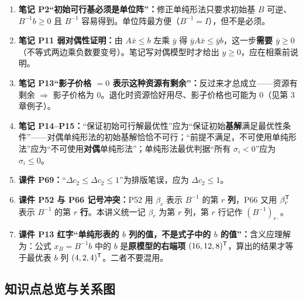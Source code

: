 \begin{correctionbox}[纠错 6　表述不严谨的几处]
\begin{enumerate}[leftmargin=1.5em]
  \item \textbf{笔记 P2“初始可行基必须是单位阵”：}修正单纯形法只要求初始基 $B$ 可逆、$B^{-1}b\ge0$ 且 $B^{-1}$ 容易得到。单位阵最方便（$B^{-1}=I$），但不是必须。
  \item \textbf{笔记 P11 弱对偶性证明：}由 $A\bar x\le b$ 左乘 $\bar y$ 得 $\bar yA\bar x\le\bar yb$，这一步\textbf{需要 $\bar y\ge0$}（不等式两边乘负数要变号）。笔记写对偶模型时才给出 $y\ge0$，应在相乘前说明。
  \item \textbf{笔记 P13“影子价格 $=0$ 表示这种资源有剩余”：}反过来才总成立——资源有剩余 $\Rightarrow$ 影子价格为 0。退化时资源恰好用尽、影子价格也可能为 0（见第 3 章例子）。
  \item \textbf{笔记 P14--P15：}“保证初始可行解最优性”应为“保证初始\textbf{基解}满足最优性条件”——对偶单纯形法的初始基解恰恰不可行；“前提不满足，不可使用单纯形法”应为“不可使用\textbf{对偶}单纯形法”；单纯形法最优判据“所有 $\sigma_i<0$”应为 $\sigma_i\le0$。
  \item \textbf{课件 P69：}“$\Delta c_2\le\Delta c_2\le1$”为排版笔误，应为 $\Delta c_2\le1$。
  \item \textbf{课件 P52 与 P66 记号冲突：}P52 用 $\beta_r$ 表示 $B^{-1}$ 的第 $r$ \textbf{列}，P66 又用 $\beta_r^{\mathsf T}$ 表示 $B^{-1}$ 的第 $r$ \textbf{行}。本讲义统一记 $\beta_r$ 为第 $r$ 列，第 $r$ 行记作 $(B^{-1})_{r\cdot}$。
  \item \textbf{课件 P13 红字“单纯形表的 $b$ 列的值，不是式子中的 $b$ 的值”：}含义应理解为：公式 $x_B=B^{-1}b$ 中的 $b$ 是\textbf{原模型的右端项} $(16,12,8)^{\mathsf T}$，算出的结果才等于最优表 $b$ 列 $(4,2,4)^{\mathsf T}$。二者不要混用。
\end{enumerate}
\end{correctionbox}

\subsection*{知识点总览与关系图}


